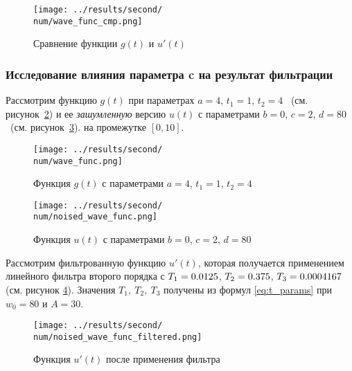 \begin{figure}[ht!]
    \centering
    \texttt{[image: ../results/second/\\num/wave\_func\_cmp.png]}
    \caption{Сравнение функции $g(t)$ и $u'(t)$}
    \label{fig:wave_func_cmp_\num}
\end{figure}

\subsubsection{Исследование влияния параметра c на результат фильтрации}


\def\num{8}
\def\a{4}
\def\from{1}
\def\to{4}
\def\b{0}
\def\c{2}
\def\d{80}
\def\L{10}
\def\A{30}
\def\Wz{80}
\def\Tf{\fpeval{round(1 / \Wz, 7)}}
\def\Ts{\fpeval{round(\A / \Wz, 7)}}
\def\Tt{\fpeval{round(1 / (\A * \Wz), 7)}}

Рассмотрим функцию $g(t)$ при параметрах $a=\a$, $t_1 = \from$, $t_2 = \to$ ~(см. рисунок~\ref{fig:wave_func_\num}) 
и ее \textit{зашумленную} версию $u(t)$ с параметрами $b = \b$, $c = \c$, $d = \d$ ~(см. рисунок~\ref{fig:noised_wave_func_\num}).
на промежутке $[0,\L]$. 

\begin{figure}[ht!]
    \centering
    \texttt{[image: ../results/second/\\num/wave\_func.png]}
    \caption{Функция $g(t)$ с параметрами $a = \a$, $t_1 = \from$, $t_2 = \to$}
    \label{fig:wave_func_\num}
\end{figure}

\begin{figure}[ht!]
    \centering
    \texttt{[image: ../results/second/\\num/noised\_wave\_func.png]}
    \caption{Функция $u(t)$ с параметрами $b = \b$, $c = \c$, $d = \d$}
    \label{fig:noised_wave_func_\num}
\end{figure}

Рассмотрим фильтрованную функцию $u'(t)$, которая получается применением линейного фильтра второго порядка с $T_1 = \Tf$, $T_2 = \Ts$, $T_3 = \Tt$ (см. рисунок \ref{fig:noised_wave_func_filtered_\num}).
Значения $T_1,~T_2,~T_3$ получены из формул \eqref{eq:t_params} при $w_0 = \Wz$ и $A = \A$.

\begin{figure}[ht!]
    \centering
    \texttt{[image: ../results/second/\\num/noised\_wave\_func\_filtered.png]}
    \caption{Функция $u'(t)$ после применения фильтра}
    \label{fig:noised_wave_func_filtered_\num}
\end{figure}

